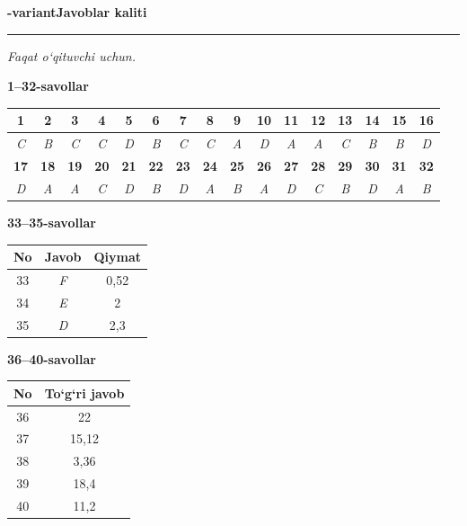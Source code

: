 \documentclass[11pt,a4paper]{article}
\begin{document}
\newpage
\noindent\textbf{\fontsize{13}{15}-variant}\hfill \textbf{Javoblar kaliti}\par\smallskip\hrule\smallskip
\textit{Faqat o`qituvchi uchun.}\par\medskip
\noindent\textbf{1--32-savollar}\par\smallskip
\noindent\begin{tabular}{|c|c|c|c|c|c|c|c|c|c|c|c|c|c|c|c|}\hline
\textbf{1} & \textbf{2} & \textbf{3} & \textbf{4} & \textbf{5} & \textbf{6} & \textbf{7} & \textbf{8} & \textbf{9} & \textbf{10} & \textbf{11} & \textbf{12} & \textbf{13} & \textbf{14} & \textbf{15} & \textbf{16}\\\hline
\textsl{C} & \textsl{B} & \textsl{C} & \textsl{C} & \textsl{D} & \textsl{B} & \textsl{C} & \textsl{C} & \textsl{A} & \textsl{D} & \textsl{A} & \textsl{A} & \textsl{C} & \textsl{B} & \textsl{B} & \textsl{D}\\\hline
\textbf{17} & \textbf{18} & \textbf{19} & \textbf{20} & \textbf{21} & \textbf{22} & \textbf{23} & \textbf{24} & \textbf{25} & \textbf{26} & \textbf{27} & \textbf{28} & \textbf{29} & \textbf{30} & \textbf{31} & \textbf{32}\\\hline
\textsl{D} & \textsl{A} & \textsl{A} & \textsl{C} & \textsl{D} & \textsl{B} & \textsl{D} & \textsl{A} & \textsl{B} & \textsl{A} & \textsl{D} & \textsl{C} & \textsl{B} & \textsl{D} & \textsl{A} & \textsl{B}\\\hline
\end{tabular}\par\medskip
\noindent\textbf{33--35-savollar}\par\smallskip
\noindent\begin{tabular}{|c|c|c|}\hline \textbf{No} & \textbf{Javob} & \textbf{Qiymat}\\\hline
33 & \textsl{F} & 0,52\\\hline
34 & \textsl{E} & 2\\\hline
35 & \textsl{D} & 2,3\\\hline
\end{tabular}\par\medskip
\noindent\textbf{36--40-savollar}\par\smallskip
\noindent\begin{tabular}{|c|c|}\hline \textbf{No} & \textbf{To`g`ri javob}\\\hline
36 & 22\\\hline
37 & 15,12\\\hline
38 & 3,36\\\hline
39 & 18,4\\\hline
40 & 11,2\\\hline
\end{tabular}\par\medskip
\end{document}
